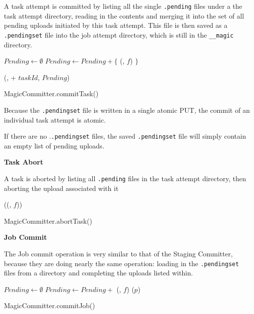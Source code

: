 \documentclass[format=acmsmall, screen=true, nonacm, timestamp, review=false]{acmart}
\begin{document}

A task attempt is committed by listing all the single \texttt{.pending} files
under a the task attempt directory, reading in the contents and merging it
into the set of all pending uploads initiated by this task attempt.
This file is then saved as a \texttt{.pendingset} file into the job attempt directory,
which is still in the \texttt{__magic} directory.

\begin{procedure}
\MagicVars

  $Pending \longleftarrow \emptyset$\;
   {
    $Pending \longleftarrow Pending + \{$ \loadPendingFile(\fs, $f$) $\}$\;
  }

  \savePendingSet(\fs, \jobAttemptPath + $taskId$, $Pending$)\;

\caption{MagicCommitter.commitTask()}
\label{alg:MagicCommitter.commitTask}

\end{procedure}

Because the \texttt{.pendingset} file is written in a single atomic PUT, the
commit of an individual task attempt is atomic.

If there are no .\texttt{.pendingset} files, the saved \texttt{.pendingset} file
will simply contain an empty list of pending uploads.


\textbf{Task Abort}

A task is aborted by listing all \texttt{.pending} files in the task attempt directory,
then aborting the upload associated with it

\begin{procedure}
  \MagicVars

   {
    \abortUpload(\loadPendingFile(\fs, $f$))\;
  }

  \caption{MagicCommitter.abortTask()}
  \label{alg:MagicCommitter.abortTask}
\end{procedure}


\textbf{Job Commit}

The Job commit operation is very similar to that of the Staging Committer, because
they are doing nearly the same operation: loading in the \texttt{.pendingset} files
from a directory and completing the uploads listed within.

\begin{procedure}
  \MagicVars

  $Pending \longleftarrow \emptyset$\;
   {
    $Pending \longleftarrow Pending + $ \loadPendingSet(\fs, $f$)\;
  }
   {
    \completeUpload($p$)\;
  }

  \caption{MagicCommitter.commitJob()}
  \label{alg:MagicCommitter.commitJob}
\end{procedure}
\end{document}
